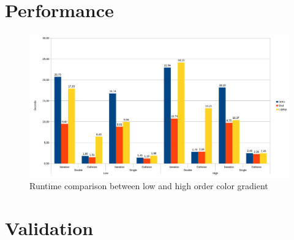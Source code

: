 \documentclass[12pt, openany]{book}
\begin{document}
{}



\appendix
\chapter{Performance}\label{app:perfo}
  \begin{figure}[H]
  	\centering
  	\includegraphics[width=\linewidth]{Resources/Images/highComp.png}
  	\caption{Runtime comparison between low and high order color gradient}
  	\label{fig:highComp}
  \end{figure}
\chapter{Validation}
\end{document}
